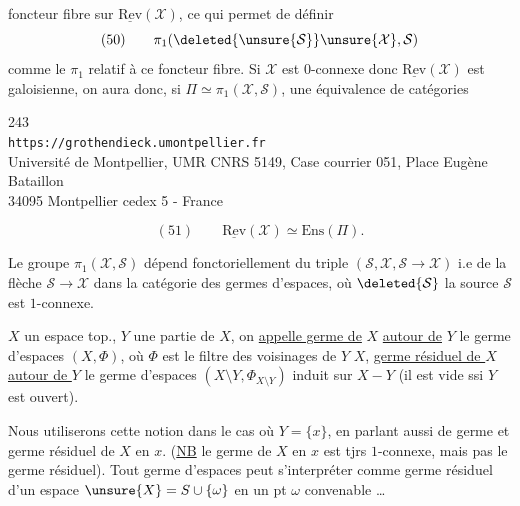 foncteur fibre sur $\underline{\mathrm{Rev}}(\mathcal X)$, ce qui permet de définir
\[
(50)\qquad \pi_1(\deleted{\unsure{\mathcal S}}\unsure{\mathcal X},\mathcal S)
\]
comme le $\pi_1$ relatif à ce foncteur fibre. Si $\mathcal X$ est $0$-connexe donc $\underline{\mathrm{Rev}}(\mathcal X)$ est galoisienne, on aura donc, si $\Pi\simeq\pi_1(\mathcal X,\mathcal S)$, une équivalence de catégories


\begin{center}
243\\
\texttt{https://grothendieck.umontpellier.fr}\\
Université de Montpellier, UMR CNRS 5149, Case courrier 051, Place Eugène Bataillon\\
34095 Montpellier cedex 5 - France
\end{center}


\[
(51)\qquad \underline{\mathrm{Rev}}(\mathcal X)\simeq\mathrm{Ens}(\Pi).
\]

Le groupe $\pi_1(\mathcal X,\mathcal S)$ dépend fonctoriellement du triple $(\mathcal S,\mathcal X,\mathcal S\longrightarrow\mathcal X)$ i.e de la flèche $\mathcal S\longrightarrow\mathcal X$ dans la catégorie des germes d'espaces, où $\deleted{\mathcal S}$ la source $\mathcal S$ est $1$-connexe.

 $X$ un espace top., $Y$ une partie de $X$, on \uline{appelle germe de} $X$ \uline{autour de} $Y$ le germe d'espaces $(X,\Phi)$, où $\Phi$ est le filtre des voisinages de $Y$  $X$, \uline{germe résiduel de $X$ autour de $Y$} le germe d'espaces $(X\setminus Y,\Phi_{X\setminus Y})$ induit sur $X-Y$ (il est vide ssi $Y$ est ouvert).


Nous utiliserons cette notion  dans le cas où $Y=\{x\}$, en parlant aussi de germe et germe résiduel de $X$ en $x$. (\uline{NB} le germe de $X$ en $x$ est tjrs  $1$-connexe, mais pas le germe résiduel). Tout germe d'espaces  peut s'interpréter comme germe résiduel d'un espace  $\unsure{X}=S\cup\{\omega\}$ en un pt $\omega$ convenable \ldots

